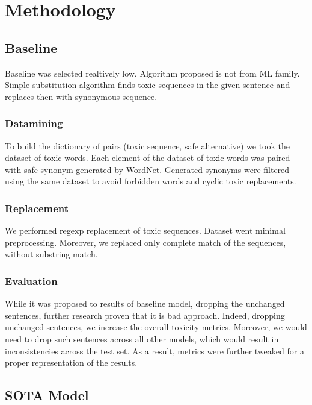 \section{Methodology}

\subsection{Baseline}

Baseline was selected realtively low. Algorithm proposed is not from ML family.
Simple substitution algorithm finds toxic sequences in the given sentence and
replaces then with synonymous sequence.

\subsubsection{Datamining}

To build the dictionary of pairs (toxic sequence, safe alternative) we took the
dataset of toxic words. Each element of the dataset of toxic words was paired
with safe synonym generated by WordNet. Generated synonyms were filtered using
the same dataset to avoid forbidden words and cyclic toxic replacements.

\subsubsection{Replacement}

We performed regexp replacement of toxic sequences. Dataset went minimal
preprocessing. Moreover, we replaced only complete match of the sequences,
without substring match.

\subsubsection{Evaluation}

While it was proposed to results of baseline model, dropping the unchanged
sentences, further research proven that it is bad approach. Indeed, dropping
unchanged sentences, we increase the overall toxicity metrics. Moreover, we
would need to drop such sentences across all other models, which would result
in inconsistencies across the test set. As a result, metrics were further
tweaked for a proper representation of the results.

\subsection{SOTA Model}

